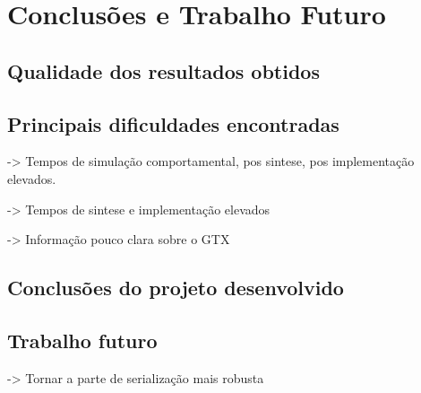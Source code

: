 \chapter{Conclusões e Trabalho Futuro} \label{chap:concl}

\section{Qualidade dos resultados obtidos}

\section{Principais dificuldades encontradas}

-> Tempos de simulação comportamental, pos sintese, pos implementação elevados.

-> Tempos de sintese e implementação elevados

-> Informação pouco clara sobre o GTX

\section{Conclusões do projeto desenvolvido}

\section{Trabalho futuro}

-> Tornar a parte de serialização mais robusta